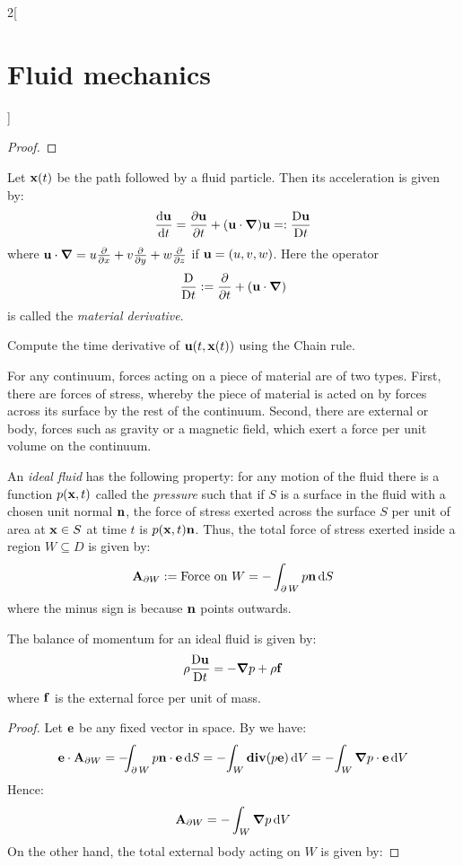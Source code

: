 \documentclass[../../../main_physics.tex]{subfiles}
\begin{document}
\begin{multicols}{2}[\section{Fluid mechanics}]
\begin{proof}
  \end{proof}
  \begin{lemma}
    Let $\boldsymbol{\mathrm{x}}(t)$ be the path followed by a fluid particle. Then its acceleration is given by:
    $$
      \dv{\boldsymbol{\mathrm{u}}}{t}=\pdv{\boldsymbol{\mathrm{u}}}{t}+(\boldsymbol{\mathrm{u}}\cdot\grad)\boldsymbol{\mathrm{u}}=:\frac{\mathrm{D}\boldsymbol{\mathrm{u}}}{\mathrm{D}t}
    $$
    where $\boldsymbol{\mathrm{u}}\cdot \grad=u\pdv{}{x}+v\pdv{}{y}+w\pdv{}{z}$ if $\boldsymbol{\mathrm{u}}=(u,v,w)$. Here the operator $$\frac{\mathrm{D}}{\mathrm{D}t}:= \pdv{}{t}+(\boldsymbol{\mathrm{u}}\cdot\grad)$$ is called the \textit{material derivative}.
  \end{lemma}
  \begin{sproof}
    Compute the time derivative of $\boldsymbol{\mathrm{u}}(t,\boldsymbol{\mathrm{x}}(t))$ using the Chain rule.
  \end{sproof}
  For any continuum, forces acting on a piece of material are of two types. First, there are forces of stress, whereby the piece of material is acted on by forces across its surface by the rest of the continuum. Second, there are external or body, forces such as gravity or a magnetic field, which exert a force per unit volume on the continuum.
  \begin{definition}\label{FLM:idealfluid}
    An \emph{ideal fluid} has the following property: for any motion of the fluid there is a function $p(\boldsymbol{\mathrm{x}},t)$ called the \emph{pressure} such that if $S$ is a surface in the fluid with a chosen unit normal $\boldsymbol{\mathrm{n}}$, the force of stress exerted across the surface $S$ per unit of area at $\boldsymbol{\mathrm{x}}\in S$ at time $t$ is $p(\boldsymbol{\mathrm{x}},t)\boldsymbol{\mathrm{n}}$. Thus, the total force of stress exerted inside a region $W\subseteq D$ is given by:
    $$
      \boldsymbol{\mathrm{A}}_{\partial W}:=\text{Force on $W$}=-\int_{\operatorname{\partial}{W}}p\boldsymbol{\mathrm{n}}\dd{S}
    $$
    where the minus sign is because $\boldsymbol{\mathrm{n}}$ points outwards.
  \end{definition}
  \begin{proposition}\label{FLM:conservationofmomentum}
    The balance of momentum for an ideal fluid is given by:
    $$
      \rho\frac{\mathrm{D}\boldsymbol{\mathrm{u}}}{\mathrm{D}t}=-\grad p+\rho\boldsymbol{\mathrm{f}}
    $$
    where $\boldsymbol{\mathrm{f}}$ is the external force per unit of mass.
  \end{proposition}
  \begin{proof}
    Let $\boldsymbol{\mathrm{e}}$ be any fixed vector in space. By  we have:
    $$
      \boldsymbol{\mathrm{e}}\cdot\boldsymbol{\mathrm{A}}_{\partial W}=-\!\!\!\int_{\operatorname{\partial}{W}}p\boldsymbol{\mathrm{n}}\cdot\boldsymbol{\mathrm{e}}\dd{S}=-\!\int_W\operatorname{\boldsymbol{\mathrm{div}}}(p\boldsymbol{\mathrm{e}})\dd{V}=-\!\int_W\grad p\cdot\boldsymbol{\mathrm{e}}\dd{V}
    $$
    Hence:
    $$
      \boldsymbol{\mathrm{A}}_{\partial W}=-\int_W\grad p\dd{V}
    $$
    On the other hand, the total external body acting on $W$ is given by:

\end{proof}
\end{multicols}
\end{document}
